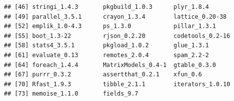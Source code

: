 \documentclass{article}\usepackage[]{graphicx}\usepackage[]{color}
\makeatletter
\newenvironment{kframe}{%
 \def\at@end@of@kframe{}%
 \ifinner\ifhmode%
  \def\at@end@of@kframe{\end{minipage}}%
  \begin{minipage}{\columnwidth}%
 \fi\fi%
 \def\FrameCommand##1{\hskip\@totalleftmargin \hskip-\fboxsep
 \colorbox{shadecolor}{##1}\hskip-\fboxsep
     \hskip-\linewidth \hskip-\@totalleftmargin \hskip\columnwidth}%
 \MakeFramed {\advance\hsize-\width
   \@totalleftmargin\z@ \linewidth\hsize
   \@setminipage}}%
 {\par\unskip\endMakeFramed%
 \at@end@of@kframe}
\newenvironment{knitrout}{}{} %
\makeatother
\begin{document}
\begin{knitrout}
\begin{kframe}
\begin{verbatim}
## [46] stringi_1.4.3       pkgbuild_1.0.3      plyr_1.8.4         
## [49] parallel_3.5.1      crayon_1.3.4        lattice_0.20-38    
## [52] emplik_1.0-4.3      ps_1.3.0            pillar_1.3.1       
## [55] boot_1.3-22         rjson_0.2.20        codetools_0.2-16   
## [58] stats4_3.5.1        pkgload_1.0.2       glue_1.3.1         
## [61] evaluate_0.13       remotes_2.0.4       spam_2.2-2         
## [64] foreach_1.4.4       MatrixModels_0.4-1  gtable_0.3.0       
## [67] purrr_0.3.2         assertthat_0.2.1    xfun_0.6           
## [70] Rfast_1.9.3         tibble_2.1.1        iterators_1.0.10   
## [73] memoise_1.1.0       fields_9.7
\end{verbatim}
\end{kframe}
\end{knitrout}
\end{document}
